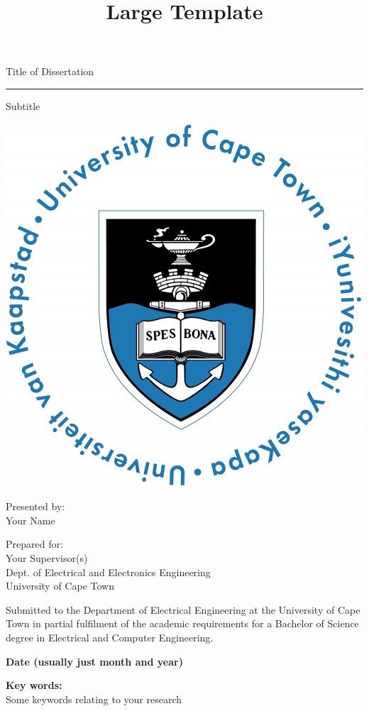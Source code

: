 \title{Large Template}

\begin{titlepage}
\begin{center}
{\Huge Title of Dissertation }
\vskip 3mm
\hrule 
{\Large Subtitle}
\end{center}

\vskip 15mm
\begin{center}
\includegraphics[scale = 0.8]{Figures/UCT.jpg}
\end{center}

\vfill

\vskip 5mm
\begin{center}
Presented by:\\
Your Name	%
\end{center}

\vskip 10mm
\begin{center}
Prepared for:\\
Your Supervisor(s)\\
Dept. of Electrical and Electronics Engineering\\University of Cape Town
\end{center}


\vskip 10mm
\begin{center}
Submitted to the Department of Electrical Engineering at the University of Cape Town in partial
fulfilment of the academic requirements for a Bachelor of Science degree in Electrical and Computer Engineering.
\end{center}


\vskip 5mm
\begin{center}{\bf Date (usually just month and year)}
\end{center}

\begin{center}
\textbf{Key words:}\\
Some keywords relating to your research
    
\end{center}

\end{titlepage}